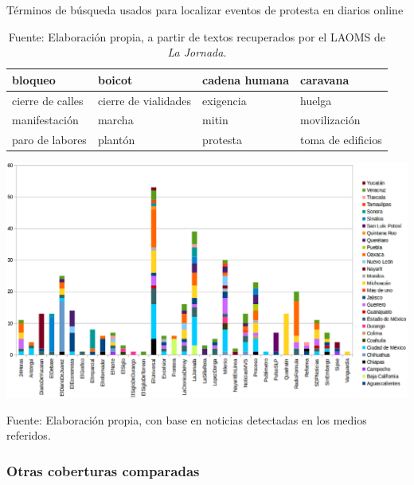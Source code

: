 \documentclass[letterpaper, 11pt]{book}
\theoremstyle{definition}
\theoremstyle{remark}
\begin{document}
\begin{table}
\center
\small
\caption{Términos de búsqueda usados para localizar eventos de protesta en diarios online}
\label{TerminosBusquedaRegional}
\begin{tabular}{ | l | l | l | l | } 
\hline
bloqueo & boicot & cadena humana & caravana \\
\hline
cierre de calles & cierre de vialidades & exigencia & huelga \\
\hline
manifestación & marcha & mitin & movilización \\
\hline
paro de labores & plantón & protesta & toma de edificios \\
\hline
\end{tabular}
\par\bigskip
\caption*{\small Fuente: Elaboración propia, a partir de textos recuperados por el LAOMS de \emph{La Jornada}.}
\end{table}


\hspace{-2em}\begin{minipage}{\linewidth}
\centering
{} \label{2.3_sesgoRegional}
\includegraphics[scale=0.4]{img/2.3_sesgoRegional.png}
\par\bigskip
\small Fuente: Elaboración propia, con base en noticias detectadas en los medios referidos.
\end{minipage}\bigskip





\subsubsection{Otras coberturas comparadas}
\label{sec:Mediosnacionales_CoberturaComparativa2}
\end{document}
